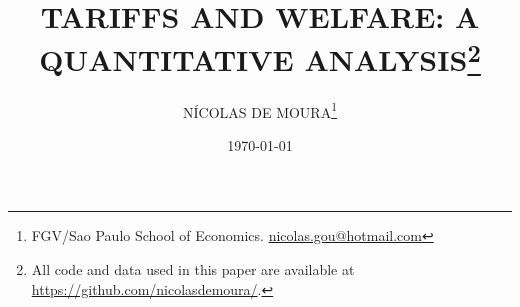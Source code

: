 \documentclass[a4paper, 12pt]{article}
\begin{document}
\title{\normalsize\MakeUppercase{\bfseries 
 Tariffs and Welfare: A Quantitative Analysis}\footnote{All code and data used in this paper are available at \url{https://github.com/nicolasdemoura/}.}}
\date{\footnotesize\MakeUppercase\today}
\author{
    \small\MakeUppercase{Nícolas de Moura}\footnote{FGV/Sao Paulo School of Economics. \href{mailto:nicolas.gou@hotmail.com}{nicolas.gou@hotmail.com}}
}
\maketitle


\newpage
\newpage
\newpage
\newpage
\newpage


\newpage



\newpage



\end{document}
